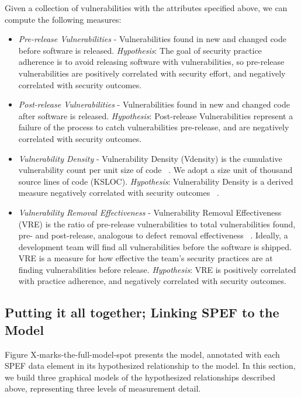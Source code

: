 Given a collection of vulnerabilities with the attributes specified above, we can compute the following measures:
\begin{itemize}
\item \textit{Pre-release Vulnerabilities} - Vulnerabilities found in new and changed code before software is released. \textit{Hypothesis}: The goal of security practice adherence is to avoid releasing software with vulnerabilities, so pre-release vulnerabilities are positively correlated with security effort, and negatively correlated with security outcomes.
\item \textit{Post-release Vulnerabilities} - Vulnerabilities found in new and changed code after software is released. \textit{Hypothesis}: Post-release Vulnerabilities represent a failure of the process to catch vulnerabilities pre-release, and are negatively correlated with security outcomes.
\item \textit{Vulnerability Density} - Vulnerability Density (Vdensity) is the cumulative vulnerability count per unit size of code ~\cite{alhazmi2007assessing}. We adopt a size unit of thousand source lines of code (KSLOC). \textit{Hypothesis}: Vulnerability Density is a derived measure negatively correlated with security outcomes ~\cite{alhazmi2007measuring}.
\item \textit{Vulnerability Removal Effectiveness} - Vulnerability Removal Effectiveness (VRE) is the ratio of pre-release vulnerabilities to total vulnerabilities found, pre- and post-release, analogous to defect removal effectiveness ~\cite{kan2002metrics}. Ideally, a development team will find all vulnerabilities before the software is shipped.  VRE is a measure for how effective the team’s security practices are at finding vulnerabilities before release. \textit{Hypothesis}: VRE is positively correlated with practice adherence, and negatively correlated with security outcomes.
\end{itemize}


\subsection{Putting it all together; Linking SPEF to the Model}

Figure X-marks-the-full-model-spot presents the model, annotated with each SPEF data element in its hypothesized relationship to the model. 
In this section, we build three graphical models of the hypothesized relationships described above, representing three levels of measurement detail.


